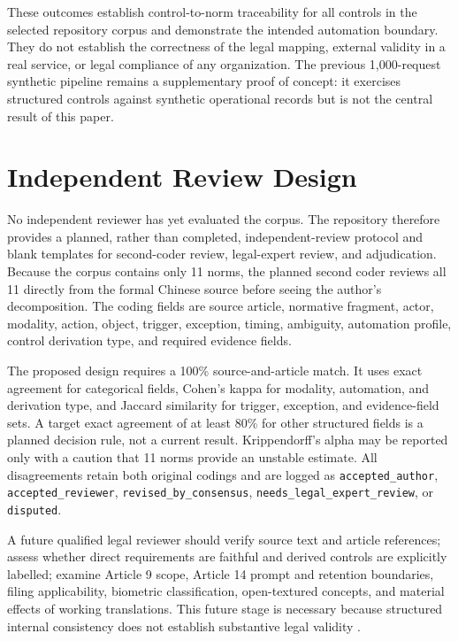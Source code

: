 \documentclass[10pt,journal]{IEEEtran}
\begin{document}
These outcomes establish control-to-norm traceability for all controls in the selected repository corpus and demonstrate the intended automation boundary. They do not establish the correctness of the legal mapping, external validity in a real service, or legal compliance of any organization. The previous 1,000-request synthetic pipeline remains a supplementary proof of concept: it exercises structured controls against synthetic operational records but is not the central result of this paper.

\section{Independent Review Design}

No independent reviewer has yet evaluated the corpus. The repository therefore provides a planned, rather than completed, independent-review protocol and blank templates for second-coder review, legal-expert review, and adjudication. Because the corpus contains only 11 norms, the planned second coder reviews all 11 directly from the formal Chinese source before seeing the author's decomposition. The coding fields are source article, normative fragment, actor, modality, action, object, trigger, exception, timing, ambiguity, automation profile, control derivation type, and required evidence fields.

The proposed design requires a 100\% source-and-article match. It uses exact agreement for categorical fields, Cohen's kappa for modality, automation, and derivation type, and Jaccard similarity for trigger, exception, and evidence-field sets. A target exact agreement of at least 80\% for other structured fields is a planned decision rule, not a current result. Krippendorff's alpha may be reported only with a caution that 11 norms provide an unstable estimate. All disagreements retain both original codings and are logged as \texttt{accepted\_author}, \texttt{accepted\_reviewer}, \texttt{revised\_by\_consensus}, \texttt{needs\_legal\_expert\_review}, or \texttt{disputed}.

A future qualified legal reviewer should verify source text and article references; assess whether direct requirements are faithful and derived controls are explicitly labelled; examine Article 9 scope, Article 14 prompt and retention boundaries, filing applicability, biometric classification, open-textured concepts, and material effects of working translations. This future stage is necessary because structured internal consistency does not establish substantive legal validity \cite{legalRuleMl2021,mohun2020cracking}.
\end{document}
